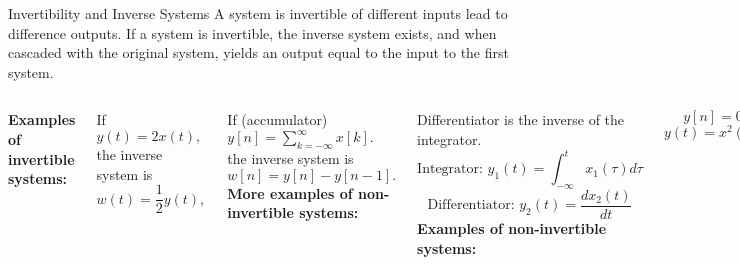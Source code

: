 \begin{frame}{Invertibility and Inverse Systems}
    A system is \alert{invertible} of different inputs lead to difference outputs. If a system is invertible, the \alert{inverse system} exists, and when cascaded with the original system, yields an output equal to the input to the first system.
    \vspace{0.1in}
    \par
    {
        \centering
    }
    {
        \vspace{0.5in}
    }
    \begin{columns}
        \noindent\textbf{Examples of invertible systems:}\par
        If
        $
            y(t) = 2x(t),
        $
        the inverse system is
        \begin{equation*}
            w(t) = \frac{1}{2}y(t),
        \end{equation*}

        If (accumulator)
        $
                y[n] = \sum_{k=-\infty}^{\infty}x[k].
        $
            the inverse system is
        \begin{equation*}
            w[n] = y[n] - y[n-1].
        \end{equation*}
        \pause
        \noindent\textbf{More examples of non-invertible systems:}\par
        Differentiator is the inverse of the integrator.
        \begin{equation*}
            \text{Integrator: } y_1(t) = \int_{-\infty}^{t}x_1(\tau)d\tau
        \end{equation*}
        \begin{equation*}
            \text{Differentiator: } y_2(t) = \frac{dx_2(t)}{dt}
        \end{equation*}
        \noindent\textbf{Examples of non-invertible systems:}\par
        \begin{equation*}
            y[n] = 0.
        \end{equation*}
        \begin{equation*}
            y(t) = x^2(t).
        \end{equation*}
    \end{columns}
\end{frame}



